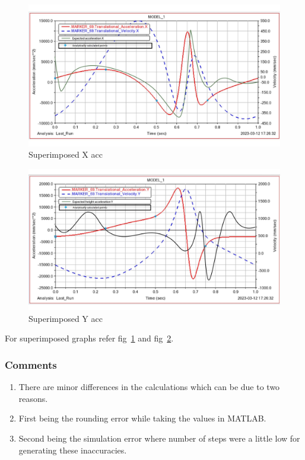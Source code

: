             \begin{figure}[hbt!]
                \centering
                \includegraphics[width=0.9\columnwidth]{Images/anal_x_acc.jpg}
                \caption{Superimposed X acc}
                \label{fig:anal_x_acc}
            \end{figure}

            \begin{figure}[hbt!]
                \centering
                \includegraphics[width=0.9\columnwidth]{Images/anal_height_acceleration.jpg}
                \caption{Superimposed Y acc}
                \label{fig:anal_y_acc}
            \end{figure}

            For superimposed graphs refer fig~\ref{fig:anal_x_acc} and fig~\ref{fig:anal_y_acc}.

        \subsubsection{Comments}
            \begin{enumerate}
                \item There are minor differences in the calculations which can be due to two reasons.
                \item First being the rounding error while taking the values in MATLAB.
                \item Second being the simulation error where number of steps were a little low for generating these inaccuracies.
            \end{enumerate}